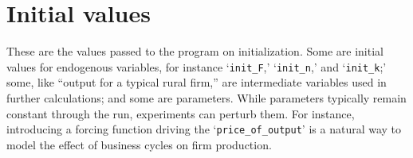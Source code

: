 \chapter{Initial values} \label{appendix-parameters}

These are the values passed to the program on initialization.  Some are initial values for endogenous variables, %
for instance `\texttt{init\_F},' `\texttt{init\_n},' and `\texttt{init\_k};' %
some, like ``output for a typical rural firm,'' are intermediate variables used in further calculations;  %
and some are parameters.  While parameters typically remain constant through the run, experiments can perturb them. For instance, introducing a forcing function driving the `\texttt{price\_of\_output}' is a natural way to model the effect of business cycles on firm production. 
